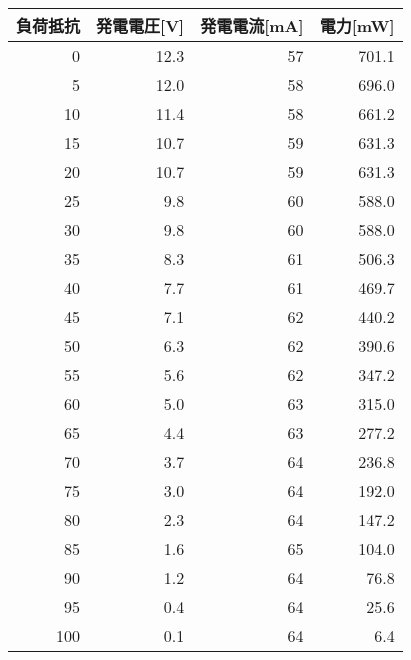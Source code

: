 \begin{tabular}{@{}rrrr@{}}
  \toprule
  \multicolumn{1}{c}{負荷抵抗} & \multicolumn{1}{c}{発電電圧{[}V{]}} & \multicolumn{1}{c}{発電電流{[}mA{]}} & \multicolumn{1}{c}{電力{[}mW{]}} \\ \midrule
  0   & 12.3 & 57 & 701.1\\
  5   & 12.0 & 58 & 696.0\\
  10  & 11.4 & 58 & 661.2\\
  15  & 10.7 & 59 & 631.3\\
  20  & 10.7 & 59 & 631.3\\
  25  & 9.8  & 60 & 588.0\\
  30  & 9.8  & 60 & 588.0\\
  35  & 8.3  & 61 & 506.3\\
  40  & 7.7  & 61 & 469.7\\
  45  & 7.1  & 62 & 440.2\\
  50  & 6.3  & 62 & 390.6\\
  55  & 5.6  & 62 & 347.2\\
  60  & 5.0  & 63 & 315.0\\
  65  & 4.4  & 63 & 277.2\\
  70  & 3.7  & 64 & 236.8\\
  75  & 3.0  & 64 & 192.0\\
  80  & 2.3  & 64 & 147.2\\
  85  & 1.6  & 65 & 104.0\\
  90  & 1.2  & 64 & 76.8 \\
  95  & 0.4  & 64 & 25.6 \\
  100 & 0.1  & 64 & 6.4  \\ \bottomrule
\end{tabular}